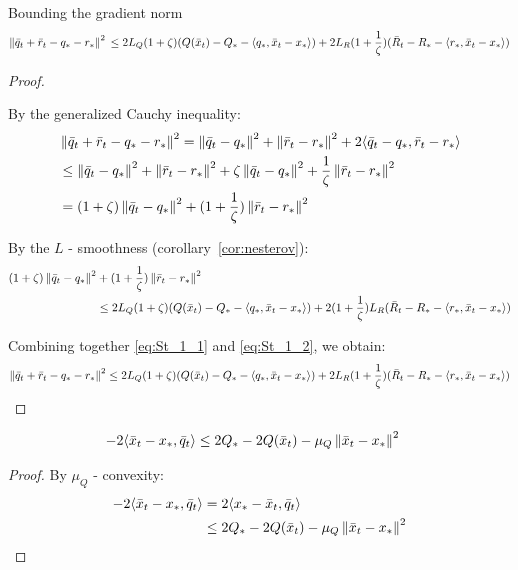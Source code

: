 \begin{lemma} \label{lem:g_t}
    Bounding the gradient norm
    \[  \left\|\bar{q}_t + \bar{r}_t - q_* - r_*\right\|^2 \\
        \leq
        2 L_Q(1 + \zeta)  (Q(\bar{x}_t) - Q_* - \langle q_*, \bar{x}_t - x_*\rangle)
        + 2 L_R(1 + \frac{1}{\zeta})  (\bar{R}_t - R_* - \langle r_*, \bar{x}_t - x_*\rangle)
    \]
\end{lemma}
\begin{proof}
$ $\par
    By the generalized Cauchy inequality:
    \begin{align}
        &\left\|\bar{q}_t + \bar{r}_t - q_* - r_*\right\|^2
        = \left\|\bar{q}_t - q_*\right\|^2 
        + \left\|\bar{r}_t - r_*\right\|^2
        + 2\langle \bar{q}_t - q_*, \bar{r}_t - r_*\rangle \label{eq:St_1_1} \\
        &\leq \left\|\bar{q}_t - q_*\right\|^2 
        + \left\|\bar{r}_t - r_*\right\|^2 
        + \zeta \left\|\bar{q}_t - q_*\right\|^2 
        + \frac{1}{\zeta} \left\|\bar{r}_t - r_*\right\|^2 \label{eq:St_1_2} \\
        &= (1 + \zeta)\left\|\bar{q}_t - q_*\right\|^2 + (1 + \frac{1}{\zeta})\left\|\bar{r}_t - r_*\right\|^2  \label{eq:St_1_1}
    \end{align}
    
    By the $L$ - smoothness (corollary~\ref{cor:nesterov}):
    \begin{align}
        (1 + \zeta)\left\|\bar{q}_t - q_*\right\|^2 &+ (1 + \frac{1}{\zeta})\left\|\bar{r}_t - r_*\right\|^2 \\
        &\leq 2 L_Q(1 + \zeta)  (Q(\bar{x}_t) - Q_* - \langle q_*, \bar{x}_t - x_*\rangle)
        + 2(1 + \frac{1}{\zeta}) L_R (\bar{R}_t - R_* - \langle r_*, \bar{x}_t - x_*\rangle) \label{eq:St_1_2}
    \end{align}
    
    Combining together \eqref{eq:St_1_1} and \eqref{eq:St_1_2}, we obtain:
    \begin{align}
        \left\|\bar{q}_t + \bar{r}_t - q_* - r_*\right\|^2 
        \leq 2 L_Q(1 + \zeta)  (Q(\bar{x}_t) - Q_* - \langle q_*, \bar{x}_t - x_*\rangle)
        + 2 L_R(1 + \frac{1}{\zeta})  (\bar{R}_t - R_* - \langle r_*, \bar{x}_t - x_*\rangle) \label{eq:St_1}
    \end{align}
\end{proof}


\begin{lemma} \label{lem:inner_1}
    \begin{align}
        -2 \langle \bar{x}_t - x_*, \bar{q}_t\rangle &\leq 2 Q_* - 2 Q(\bar{x}_t) - \mu_Q \left\|\bar{x}_t - x_*\right\|^2 \label{eq:St_2}
    \end{align}
\end{lemma}
\begin{proof}
    By $\mu_Q$ - convexity:
    \begin{align}
        -2 \langle \bar{x}_t - x_*, \bar{q}_t\rangle &= 2 \langle x_* - \bar{x}_t, \bar{q}_t\rangle \\
        &\leq 2 Q_* - 2 Q(\bar{x}_t) - \mu_Q \left\|\bar{x}_t - x_*\right\|^2
    \end{align}
\end{proof}


